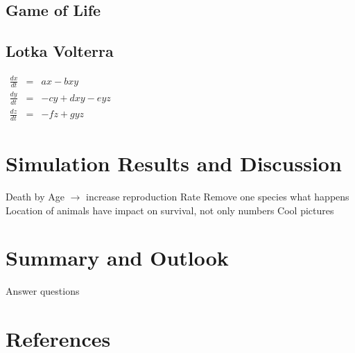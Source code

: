 \documentclass[11pt]{article}
\begin{document}
\subsection{Game of Life}

\subsection{Lotka Volterra}

$
\begin{array}{rcl}
\frac{dx}{dt} & = & ax-bxy \\ 
\frac{dy}{dt} & = & -cy+dxy-eyz \\ 
\frac{dz}{dt} & = & -fz+gyz
\end{array}
$
\section{Simulation Results and Discussion}
Death by Age $\rightarrow$ increase reproduction Rate
Remove one species what happens
Location of animals have impact on survival, not only numbers
Cool pictures

\section{Summary and Outlook}
Answer questions


\section{References}




\end{document}
